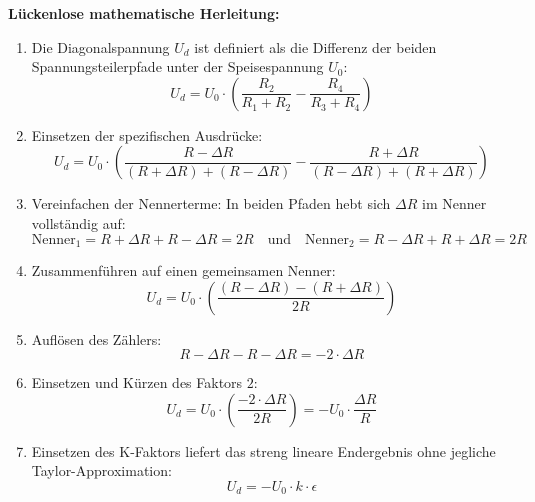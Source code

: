 \documentclass[11pt,a4paper]{article}
\begin{document}
\textbf{Lückenlose mathematische Herleitung:}
\begin{enumerate}
    \item Die Diagonalspannung $U_d$ ist definiert als die Differenz der beiden Spannungsteilerpfade unter der Speisespannung $U_0$:
    \begin{equation}
    U_d = U_0 \cdot \left( \frac{R_2}{R_1 + R_2} - \frac{R_4}{R_3 + R_4} \right)
    \end{equation}
    \item Einsetzen der spezifischen Ausdrücke:
    \begin{equation}
    U_d = U_0 \cdot \left( \frac{R - \Delta R}{(R + \Delta R) + (R - \Delta R)} - \frac{R + \Delta R}{(R - \Delta R) + (R + \Delta R)} \right)
    \end{equation}
    \item Vereinfachen der Nennerterme: In beiden Pfaden hebt sich $\Delta R$ im Nenner vollständig auf:
    \begin{equation}
    \text{Nenner}_1 = R + \Delta R + R - \Delta R = 2R \quad \text{und} \quad \text{Nenner}_2 = R - \Delta R + R + \Delta R = 2R
    \end{equation}
    \item Zusammenführen auf einen gemeinsamen Nenner:
    \begin{equation}
    U_d = U_0 \cdot \left( \frac{(R - \Delta R) - (R + \Delta R)}{2R} \right)
    \end{equation}
    \item Auflösen des Zählers:
    \begin{equation}
    R - \Delta R - R - \Delta R = -2 \cdot \Delta R
    \end{equation}
    \item Einsetzen und Kürzen des Faktors $2$:
    \begin{equation}
    U_d = U_0 \cdot \left( \frac{-2 \cdot \Delta R}{2R} \right) = -U_0 \cdot \frac{\Delta R}{R}
    \end{equation}
    \item Einsetzen des K-Faktors liefert das streng lineare Endergebnis ohne jegliche Taylor-Approximation:
    \begin{equation}
    U_d = -U_0 \cdot k \cdot \epsilon
    \end{equation}
\end{enumerate}

\newpage

\end{document}
